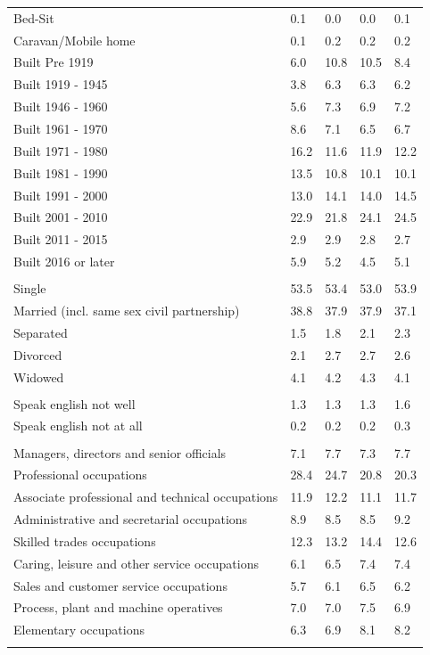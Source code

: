 \documentclass{article}
\begin{document}
\begin{table}[h]
\begin{tabular}{KTTTT}
Bed-Sit & 0.1& 0.0& 0.0& 0.1\\
Caravan/Mobile home & 0.1& 0.2& 0.2& 0.2\\
    \hline
Built Pre 1919 &  6.0& 10.8& 10.5&  8.4\\
Built 1919 - 1945 & 3.8& 6.3& 6.3& 6.2\\
Built  1946 - 1960 & 5.6& 7.3& 6.9& 7.2\\
Built  1961 - 1970 & 8.6& 7.1& 6.5& 6.7\\
Built  1971 - 1980 & 16.2& 11.6& 11.9& 12.2\\
Built  1981 - 1990 & 13.5& 10.8& 10.1& 10.1\\
Built  1991 - 2000 & 13.0& 14.1& 14.0& 14.5\\
Built  2001 - 2010 & 22.9& 21.8& 24.1& 24.5\\
Built  2011 - 2015 & 2.9& 2.9& 2.8& 2.7\\
Built  2016 or later & 5.9& 5.2& 4.5& 5.1\\
\hline
    \\
    \hline
Single & 53.5& 53.4& 53.0& 53.9\\
Married (incl. same sex civil partnership) & 38.8& 37.9& 37.9& 37.1\\
Separated  & 1.5& 1.8& 2.1& 2.3\\
Divorced  & 2.1& 2.7& 2.7& 2.6\\
Widowed & 4.1& 4.2& 4.3& 4.1\\
\hline
    \\ 
    \hline
Speak english not well & 1.3& 1.3& 1.3& 1.6\\
Speak english not at all & 0.2& 0.2& 0.2& 0.3\\
\hline
    \\
    \hline
Managers, directors and senior officials & 7.1& 7.7& 7.3& 7.7\\
Professional occupations & 28.4& 24.7& 20.8& 20.3\\
Associate professional and technical occupations & 11.9& 12.2& 11.1& 11.7\\
Administrative and secretarial occupations & 8.9& 8.5& 8.5& 9.2\\
Skilled trades occupations & 12.3& 13.2& 14.4& 12.6\\
Caring, leisure and other service occupations & 6.1& 6.5& 7.4& 7.4\\
Sales and customer service occupations & 5.7& 6.1& 6.5& 6.2\\
Process, plant and machine operatives & 7.0& 7.0& 7.5& 6.9\\
Elementary occupations & 6.3& 6.9& 8.1& 8.2\\
\hline
\end{tabular}
\end{table}
\end{document}
